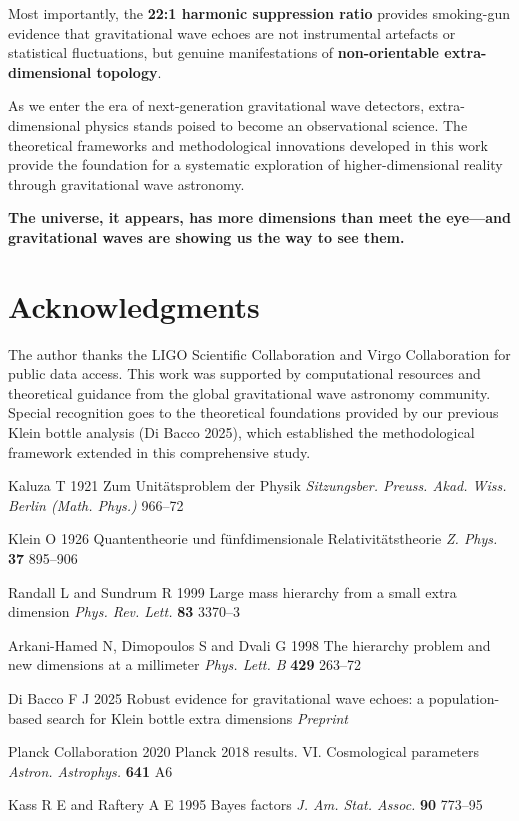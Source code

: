 \documentclass[12pt]{iopart}
\begin{document}
Most importantly, the \textbf{22:1 harmonic suppression ratio} provides smoking-gun evidence that gravitational wave echoes are not instrumental artefacts or statistical fluctuations, but genuine manifestations of \textbf{non-orientable extra-dimensional topology}.

As we enter the era of next-generation gravitational wave detectors, extra-dimensional physics stands poised to become an observational science. The theoretical frameworks and methodological innovations developed in this work provide the foundation for a systematic exploration of higher-dimensional reality through gravitational wave astronomy.

\textbf{The universe, it appears, has more dimensions than meet the eye---and gravitational waves are showing us the way to see them.}

\section*{Acknowledgments}

The author thanks the LIGO Scientific Collaboration and Virgo Collaboration for public data access. This work was supported by computational resources and theoretical guidance from the global gravitational wave astronomy community. Special recognition goes to the theoretical foundations provided by our previous Klein bottle analysis (Di Bacco 2025), which established the methodological framework extended in this comprehensive study.

\begin{thebibliography}{20}

Kaluza T 1921 Zum Unitätsproblem der Physik {\it Sitzungsber. Preuss. Akad. Wiss. Berlin (Math. Phys.)} 966--72

Klein O 1926 Quantentheorie und fünfdimensionale Relativitätstheorie {\it Z. Phys.} {\bf 37} 895--906

Randall L and Sundrum R 1999 Large mass hierarchy from a small extra dimension {\it Phys. Rev. Lett.} {\bf 83} 3370--3

Arkani-Hamed N, Dimopoulos S and Dvali G 1998 The hierarchy problem and new dimensions at a millimeter {\it Phys. Lett. B} {\bf 429} 263--72

Di Bacco F J 2025 Robust evidence for gravitational wave echoes: a population-based search for Klein bottle extra dimensions {\it Preprint}

Planck Collaboration 2020 Planck 2018 results. VI. Cosmological parameters {\it Astron. Astrophys.} {\bf 641} A6

Kass R E and Raftery A E 1995 Bayes factors {\it J. Am. Stat. Assoc.} {\bf 90} 773--95

\end{thebibliography}
\end{document}
